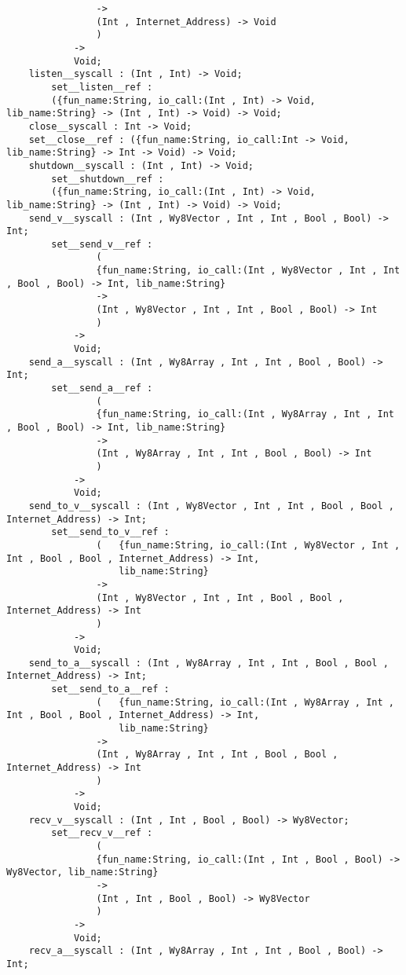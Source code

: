 \begin{verbatim}
                ->
                (Int , Internet_Address) -> Void
                )
            ->
            Void;
    listen__syscall : (Int , Int) -> Void;
        set__listen__ref :
        ({fun_name:String, io_call:(Int , Int) -> Void, lib_name:String} -> (Int , Int) -> Void) -> Void;
    close__syscall : Int -> Void;
    set__close__ref : ({fun_name:String, io_call:Int -> Void, lib_name:String} -> Int -> Void) -> Void;
    shutdown__syscall : (Int , Int) -> Void;
        set__shutdown__ref :
        ({fun_name:String, io_call:(Int , Int) -> Void, lib_name:String} -> (Int , Int) -> Void) -> Void;
    send_v__syscall : (Int , Wy8Vector , Int , Int , Bool , Bool) -> Int;
        set__send_v__ref :
                (
                {fun_name:String, io_call:(Int , Wy8Vector , Int , Int , Bool , Bool) -> Int, lib_name:String}
                ->
                (Int , Wy8Vector , Int , Int , Bool , Bool) -> Int
                )
            ->
            Void;
    send_a__syscall : (Int , Wy8Array , Int , Int , Bool , Bool) -> Int;
        set__send_a__ref :
                (
                {fun_name:String, io_call:(Int , Wy8Array , Int , Int , Bool , Bool) -> Int, lib_name:String}
                ->
                (Int , Wy8Array , Int , Int , Bool , Bool) -> Int
                )
            ->
            Void;
    send_to_v__syscall : (Int , Wy8Vector , Int , Int , Bool , Bool , Internet_Address) -> Int;
        set__send_to_v__ref :
                (   {fun_name:String, io_call:(Int , Wy8Vector , Int , Int , Bool , Bool , Internet_Address) -> Int,
                    lib_name:String}
                ->
                (Int , Wy8Vector , Int , Int , Bool , Bool , Internet_Address) -> Int
                )
            ->
            Void;
    send_to_a__syscall : (Int , Wy8Array , Int , Int , Bool , Bool , Internet_Address) -> Int;
        set__send_to_a__ref :
                (   {fun_name:String, io_call:(Int , Wy8Array , Int , Int , Bool , Bool , Internet_Address) -> Int,
                    lib_name:String}
                ->
                (Int , Wy8Array , Int , Int , Bool , Bool , Internet_Address) -> Int
                )
            ->
            Void;
    recv_v__syscall : (Int , Int , Bool , Bool) -> Wy8Vector;
        set__recv_v__ref :
                (
                {fun_name:String, io_call:(Int , Int , Bool , Bool) -> Wy8Vector, lib_name:String}
                ->
                (Int , Int , Bool , Bool) -> Wy8Vector
                )
            ->
            Void;
    recv_a__syscall : (Int , Wy8Array , Int , Int , Bool , Bool) -> Int;

\end{verbatim}
